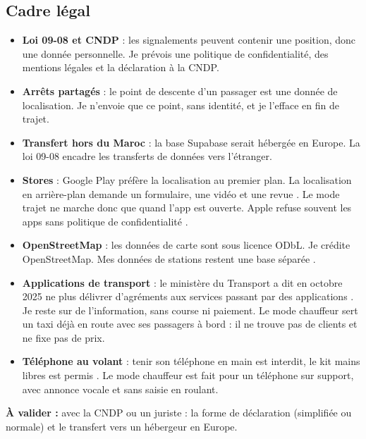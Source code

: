 \documentclass[11pt,a4paper]{article}
\newcommand{\valider}[1]{\begin{avalider}\textbf{À valider :} #1\end{avalider}}
\begin{document}
\subsection{Cadre légal}
\begin{itemize}
\item \textbf{Loi 09-08 et CNDP} : les signalements peuvent contenir une position, donc une donnée personnelle. Je prévois une politique de confidentialité, des mentions légales et la déclaration à la CNDP.
\item \textbf{Arrêts partagés} : le point de descente d'un passager est une donnée de localisation. Je n'envoie que ce point, sans identité, et je l'efface en fin de trajet.
\item \textbf{Transfert hors du Maroc} : la base Supabase serait hébergée en Europe. La loi 09-08 encadre les transferts de données vers l'étranger.
\item \textbf{Stores} : Google Play préfère la localisation au premier plan. La localisation en arrière-plan demande un formulaire, une vidéo et une revue \cite{playloc}. Le mode trajet ne marche donc que quand l'app est ouverte. Apple refuse souvent les apps sans politique de confidentialité \cite{stores}.
\item \textbf{OpenStreetMap} : les données de carte sont sous licence ODbL. Je crédite OpenStreetMap. Mes données de stations restent une base séparée \cite{osm}.
\item \textbf{Applications de transport} : le ministère du Transport a dit en octobre 2025 ne plus délivrer d'agréments aux services passant par des applications \cite{mwnuber}. Je reste sur de l'information, sans course ni paiement. Le mode chauffeur sert un taxi déjà en route avec ses passagers à bord : il ne trouve pas de clients et ne fixe pas de prix.
\item \textbf{Téléphone au volant} : tenir son téléphone en main est interdit, le kit mains libres est permis \cite{mre}. Le mode chauffeur est fait pour un téléphone sur support, avec annonce vocale et sans saisie en roulant.
\end{itemize}
\valider{avec la CNDP ou un juriste : la forme de déclaration (simplifiée ou normale) et le transfert vers un hébergeur en Europe.}

\Needspace{8cm}
\end{document}
